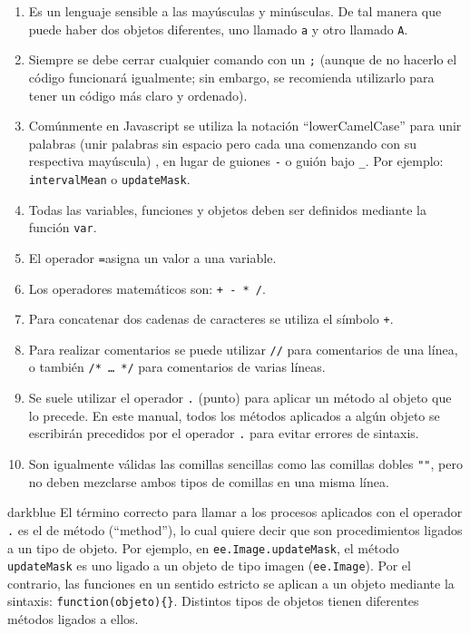 \documentclass[
  12pt,
  letterpaper,
  twoside]{book}
\providecommand{\tightlist}{%
  \setlength{\itemsep}{0pt}\setlength{\parskip}{0pt}}
\begin{document}
\begin{enumerate}
\def\labelenumi{\arabic{enumi}.}
\tightlist
\item
  Es un lenguaje sensible a las mayúsculas y minúsculas. De tal manera que puede haber dos objetos diferentes, uno llamado \texttt{a} y otro llamado \texttt{A}.
\item
  Siempre se debe cerrar cualquier comando con un \texttt{;} (aunque de no hacerlo el código funcionará igualmente; sin embargo, se recomienda utilizarlo para tener un código más claro y ordenado).
\item
  Comúnmente en Javascript se utiliza la notación ``lowerCamelCase'' para unir palabras (unir palabras sin espacio pero cada una comenzando con su respectiva mayúscula) , en lugar de guiones \texttt{-} o guión bajo \texttt{\_}. Por ejemplo: \texttt{intervalMean} o \texttt{updateMask}.
\item
  Todas las variables, funciones y objetos deben ser definidos mediante la función \texttt{var}.
\item
  El operador \texttt{=}asigna un valor a una variable.
\item
  Los operadores matemáticos son: \texttt{+\ -\ *\ /}.
\item
  Para concatenar dos cadenas de caracteres se utiliza el símbolo \texttt{+}.
\item
  Para realizar comentarios se puede utilizar \texttt{//} para comentarios de una línea, o también \texttt{/*\ \ldots{}\ */} para comentarios de varias líneas.
\item
  Se suele utilizar el operador \texttt{.} (punto) para aplicar un método al objeto que lo precede. En este manual, todos los métodos aplicados a algún objeto se escribirán precedidos por el operador \texttt{.} para evitar errores de sintaxis.
\item
  Son igualmente válidas las comillas sencillas \texttt{\textquotesingle{}\textquotesingle{}} como las comillas dobles \texttt{""}, pero no deben mezclarse ambos tipos de comillas en una misma línea.
\end{enumerate}

\begin{bluebox2}

\begin{awesomeblock}{5pt}{\faLightbulb}{darkblue}
El término correcto para llamar a los procesos aplicados con el operador \texttt{.} es el de método (``method''), lo cual quiere decir que son procedimientos ligados a un tipo de objeto. Por ejemplo, en \texttt{ee.Image.updateMask}, el método \texttt{updateMask} es uno ligado a un objeto de tipo imagen (\texttt{ee.Image}). Por el contrario, las funciones en un sentido estricto se aplican a un objeto mediante la sintaxis: \texttt{function(objeto)\{\}}. Distintos tipos de objetos tienen diferentes métodos ligados a ellos.

\end{awesomeblock}

\end{bluebox2}
\end{document}
